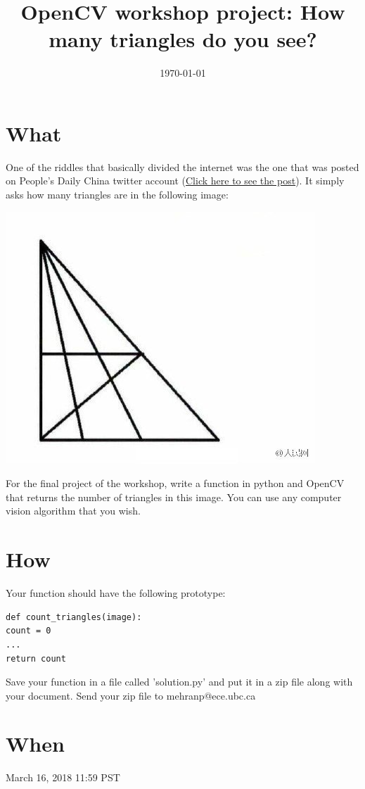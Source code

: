 \documentclass[11pt]{article}
\date{\today}
\title{OpenCV workshop project: How many triangles do you see?}
\begin{document}
\maketitle

\section{What}
\label{sec:orgd1924f1}
One of the riddles that basically divided the internet was the one that was posted on People's Daily China twitter account (\href{https://twitter.com/PDChina/status/806615066133090308/photo/1?ref\_src=twsrc\%255Etfw\&ref\_url=https\%253A\%252F\%252Fwww.telegraph.co.uk\%252Fnews\%252F2016\%252F12\%252F08\%252Fmany-triangles-can-see-puzzle-divides-internet\%252F}{Click here to see the post}).
It simply asks how many triangles are in the following image:
\begin{center}
\includegraphics[width=.9\linewidth]{./final.jpeg}
\end{center}

For the final project of the workshop, write a function in python and OpenCV that returns the number of triangles in this image. You can use any computer vision algorithm that you wish.

\section{How}
\label{sec:orgcb350a2}
Your function should have the following prototype:

\begin{verbatim}
def count_triangles(image):
count = 0
...
return count 
\end{verbatim}

Save your function in a file called 'solution.py' and put it in a zip file along with your document.
Send your zip file to mehranp@ece.ubc.ca

\section{When}
\label{sec:orgfbd626b}
March 16, 2018 11:59 PST
\end{document}
